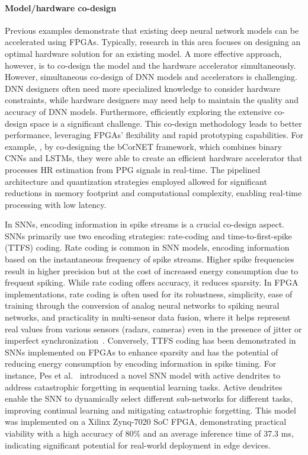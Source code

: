 \paragraph{Model/hardware co-design} Previous examples demonstrate that existing deep neural network models can be accelerated using FPGAs. Typically, research in this area focuses on designing an optimal hardware solution for an existing model. A more effective approach, however, is to co-design the model and the hardware accelerator simultaneously. However, simultaneous co-design of DNN models and accelerators is challenging. DNN designers often need more specialized knowledge to consider hardware constraints, while hardware designers may need help to maintain the quality and accuracy of DNN models. Furthermore, efficiently exploring the extensive co-design space is a significant challenge. This co-design methodology leads to better performance, leveraging FPGAs' flexibility and rapid prototyping capabilities. For example, \citet{Rocha2020BinaryWrist-PPG}, by co-designing the bCorNET framework, which combines binary CNNs and LSTMs, they were able to create an efficient hardware accelerator that processes HR estimation from PPG signals in real-time. The pipelined architecture and quantization strategies employed allowed for significant reductions in memory footprint and computational complexity, enabling real-time processing with low latency.

In SNNs, encoding information in spike streams is a crucial co-design aspect. SNNs primarily use two encoding strategies: rate-coding and time-to-first-spike (TTFS) coding. Rate coding is common in SNN models, encoding information based on the instantaneous frequency of spike streams. Higher spike frequencies result in higher precision but at the cost of increased energy consumption due to frequent spiking. While rate coding offers accuracy, it reduces sparsity. In FPGA implementations, rate coding is often used for its robustness, simplicity, ease of training through the conversion of analog neural networks to spiking neural networks, and practicality in multi-sensor data fusion, where it helps represent real values from various sensors (radars, cameras) even in the presence of jitter or imperfect synchronization~\cite{Corradi2021Gyro:Analytics}.
Conversely, TTFS coding has been demonstrated in SNNs implemented on FPGAs to enhance sparsity and has the potential of reducing energy consumption by encoding information in spike timing. For instance, Pes et al.~\cite{Pes2024ActiveNetworks} introduced a novel SNN model with active dendrites to address catastrophic forgetting in sequential learning tasks. Active dendrites enable the SNN to dynamically select different sub-networks for different tasks, improving continual learning and mitigating catastrophic forgetting. This model was implemented on a Xilinx Zynq-7020 SoC FPGA, demonstrating practical viability with a high accuracy of 80\% and an average inference time of 37.3 ms, indicating significant potential for real-world deployment in edge devices.

